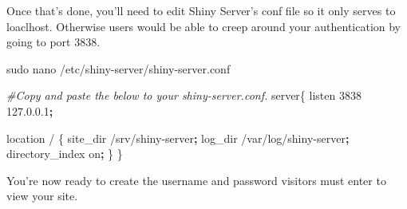 \documentclass[
]{book}
\newenvironment{Shaded}{\begin{snugshade}}{\end{snugshade}}
\newcommand{\CommentTok}[1]{\textcolor[rgb]{0.56,0.35,0.01}{\textit{#1}}}
\newcommand{\ExtensionTok}[1]{#1}
\newcommand{\FunctionTok}[1]{\textcolor[rgb]{0.00,0.00,0.00}{#1}}
\newcommand{\KeywordTok}[1]{\textcolor[rgb]{0.13,0.29,0.53}{\textbf{#1}}}
\newcommand{\NormalTok}[1]{#1}
\newcommand{\StringTok}[1]{\textcolor[rgb]{0.31,0.60,0.02}{#1}}
\newcommand{\VariableTok}[1]{\textcolor[rgb]{0.00,0.00,0.00}{#1}}
\begin{document}
\begin{Shaded}
\end{Shaded}

Once that's done, you'll need to edit Shiny Server's conf file so it only serves to loaclhost. Otherwise users would be able to creep around your authentication by going to port 3838.

\begin{Shaded}
\begin{Highlighting}[]
\FunctionTok{sudo}\NormalTok{ nano /etc/shiny-server/shiny-server.conf}

\CommentTok{#Copy and paste the below to your shiny-server.conf.}
\ExtensionTok{server}\NormalTok{\{}
    \ExtensionTok{listen}\NormalTok{ 3838 127.0.0.1}\KeywordTok{;}
    
    \ExtensionTok{location}\NormalTok{ / \{}
    \ExtensionTok{site_dir}\NormalTok{ /srv/shiny-server}\KeywordTok{;}
    \ExtensionTok{log_dir}\NormalTok{ /var/log/shiny-server}\KeywordTok{;}
    \ExtensionTok{directory_index}\NormalTok{ on}\KeywordTok{;}
\NormalTok{    \}}
\NormalTok{\}}
\end{Highlighting}
\end{Shaded}

You're now ready to create the username and password visitors must enter to view your site.
\end{document}
